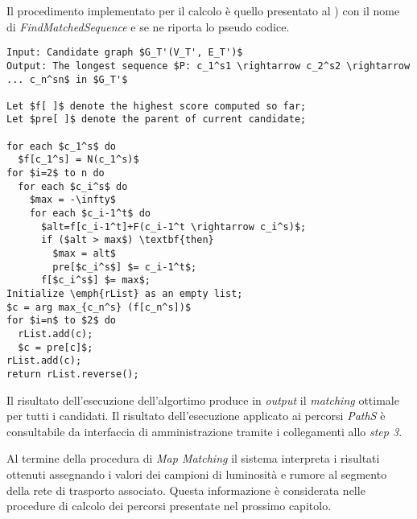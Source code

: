 Il procedimento implementato per il calcolo è quello presentato al \cite[paragrafo 5.4]{stmapmatching}) con il nome di \emph{FindMatchedSequence} e se ne riporta lo pseudo codice.
\begin{lstlisting}[mathescape]
Input: Candidate graph $G_T'(V_T', E_T')$
Output: The longest sequence $P: c_1^s1 \rightarrow c_2^s2 \rightarrow ... c_n^sn$ in $G_T'$

Let $f[ ]$ denote the highest score computed so far;
Let $pre[ ]$ denote the parent of current candidate;

for each $c_1^s$ do
  $f[c_1^s] = N(c_1^s)$
for $i=2$ to n do
  for each $c_i^s$ do
    $max = -\infty$
    for each $c_i-1^t$ do
      $alt=f[c_i-1^t]+F(c_i-1^t \rightarrow c_i^s)$;
      if ($alt > max$) \textbf{then}
        $max = alt$
        pre[$c_i^s$] $= c_i-1^t$;
      f[$c_i^s$] $= max$;
Initialize \emph{rList} as an empty list;
$c = arg max_{c_n^s} (f[c_n^s])$
for $i=n$ to $2$ do
  rList.add(c);
  $c = pre[c]$;
rList.add(c);
return rList.reverse();
\end{lstlisting}
Il risultato dell'esecuzione dell'algortimo produce in \emph{output} il \emph{matching} ottimale per tutti i candidati. Il risultato dell'esecuzione applicato ai percorsi \emph{PathS} è consultabile da interfaccia di amministrazione tramite i collegamenti allo \emph{step 3}.

Al termine della procedura di \emph{Map Matching} il sistema interpreta i risultati ottenuti assegnando i valori dei campioni di luminosità e rumore al segmento della rete di trasporto associato. Questa informazione è considerata nelle procedure di calcolo dei percorsi presentate nel prossimo capitolo.
